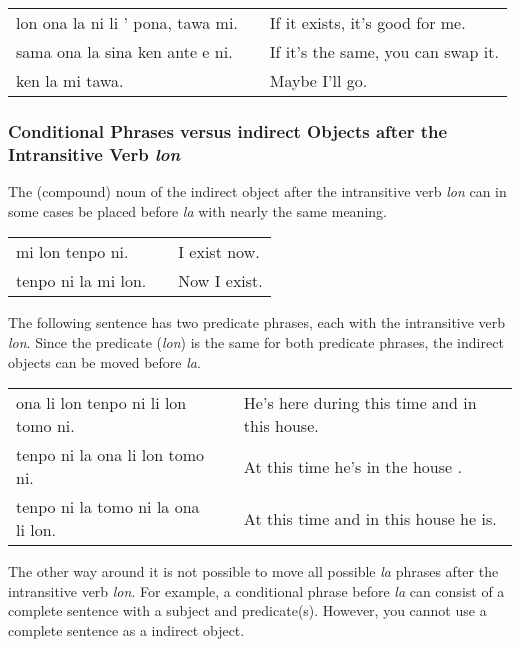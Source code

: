 \begin{supertabular}{p{5,5cm}|ll}
lon ona la ni li ' pona, tawa mi. && If it exists, it's good for me. \\
sama ona la sina ken ante e ni. && If it's the same, you can swap it. \\
ken la mi tawa. && Maybe I'll go. \\
\end{supertabular}

%
%
\subsubsection*{Conditional Phrases versus indirect Objects after the Intransitive Verb \textit{lon} }
%
The (compound) noun of the indirect object after the intransitive verb \textit{lon} can in some cases be placed before \textit{la} with nearly the same meaning.

\begin{supertabular}{p{5,5cm}|ll}
mi lon tenpo ni. && I exist now. \\
tenpo ni la mi lon. && Now I exist. \\
\end{supertabular}

The following sentence has two predicate phrases, each with the intransitive verb \textit{lon}. 
Since the predicate (\textit{lon}) is the same for both predicate phrases, the indirect objects can be moved before \textit{la}. 

\begin{supertabular}{p{5,5cm}|ll}
ona li lon tenpo ni li lon tomo ni. && He's here during this time and in this house. \\
tenpo ni la ona li lon tomo ni.     && At this time he's in the house . \\  
tenpo ni la tomo ni la ona li lon.  && At this time and in this house he is. \\  
\end{supertabular}

The other way around it is not possible to move all possible \textit{la} phrases after the intransitive verb \textit{lon}. 
For example, a conditional phrase before \textit{la} can consist of a complete sentence with a subject and predicate(s). 
However, you cannot use a complete sentence as a indirect object.

%
%
